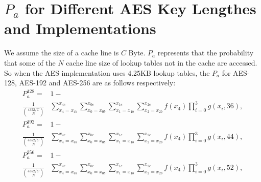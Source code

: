 \section{$P_{a}$ for Different AES Key Lengthes and Implementations}
\label{appendixb}
We assume the size of a cache line is $C$ Byte. $P_{a}$ represents that the probability that some of the $N$ cache line size of lookup tables not in the cache are accessed. So when the AES implementation uses 4.25KB lookup tables, the $P_{a}$ for AES-128, AES-192 and AES-256 are as follows respectively:
\begin{align}
    P_{a}^{128} = &1-   \nonumber \\
    \frac{1}{\binom{4352/C}{N}}&\sum_{x_4=x_{4b}}^{x_{4e}}{\sum_{x_0=x_{0b}}^{x_{0e}}{\sum_{x_1=x_{1b}}^{x_{1e}}{ \sum_{x_2=x_{2b}}^{x_{2e}}{f(x_4)\prod_{i=0}^{3}{g(x_i,36)}}}}}, \nonumber
\end{align}
\begin{align}
    P_{a}^{192} = &1-  \nonumber \\
    \frac{1}{\binom{4352/C}{N}}&\sum_{x_4=x_{4b}}^{x_{4e}}{\sum_{x_0=x_{0b}}^{x_{0e}}{\sum_{x_1=x_{1b}}^{x_{1e}}{ \sum_{x_2=x_{2b}}^{x_{2e}}{f(x_4)\prod_{i=0}^{3}{g(x_i,44)}}}}}, \nonumber
\end{align}
\begin{align}
    P_{a}^{256} = &1-  \nonumber \\
    \frac{1}{\binom{4352/C}{N}}&\sum_{x_4=x_{4b}}^{x_{4e}}{\sum_{x_0=x_{0b}}^{x_{0e}}{\sum_{x_1=x_{1b}}^{x_{1e}}{ \sum_{x_2=x_{2b}}^{x_{2e}}{f(x_4)\prod_{i=0}^{3}{g(x_i,52)}}}}}, \nonumber
\end{align}

